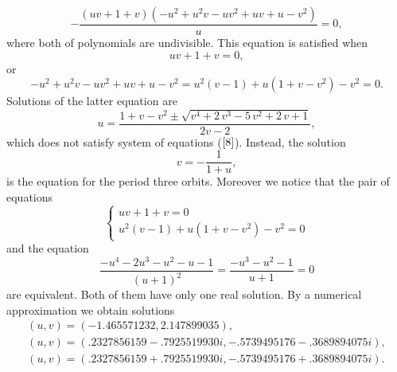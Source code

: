 \documentclass[12pt,a4paper]{amsart}
\numberwithin{equation}{section}
\numberwithin{lause}{section}
\begin{document}
 
\begin{displaymath}
-{\frac { \left( uv+1+v \right)  \left( -{u}^{2}+{u}^{2}v-u{v}^{2}+uv+
u-{v}^{2} \right) }{u}}=0,
\end{displaymath}
where both of polynomials are undivisible.
This equation is satisfied when
\begin{displaymath}
uv+1+v=0,
\end{displaymath}
or
\begin{displaymath}
 -{u}^{2}+{u}^{2}v-u{v}^{2}+uv+
u-{v}^{2} ={u}^{2}(v-1)+u(1+v-{v}^{2})-{v}^{2}
=0.
\end{displaymath}
Solutions of the latter equation are
\begin{displaymath}
u=\frac{1+v-{v}^{2} \pm \sqrt{{v}^{4}+2\,{v}^{3}-5\,{v}^{2}+2\,v+1}}{2v-2},
\end{displaymath}
which does not satisfy system of equations ($\ref{8}$). Instead, the solution
\begin{equation}
v=-\frac{1}{1+u}, \label{84}
\end{equation}
is the equation for the period three orbits. Moreover we notice that the pair of equations
\begin{displaymath}
\left\{\begin{array}{l}
   uv+1+v=0   \\
     {u}^{2}(v-1)+u(1+v-{v}^{2})-{v}^{2}=0
\end{array}\right.
\end{displaymath}
and the equation
\begin{displaymath}
\frac{-u^{4}-2u^{3}-u^{2}-u-1}{(u+1)^{2}}=\frac{-{u}^{3}-{u}^{2}-1}{u+1}=0
\end{displaymath}
are equivalent. Both of them have only one real solution. By a numerical approximation we obtain solutions
 \begin{displaymath}
\begin{array}{l}
 (u,v)=(-1.465571232, 2.147899035), \\ (u,v)=(.2327856159-.7925519930i, -.5739495176-.3689894075i),\\ (u,v)=(.2327856159+.7925519930i, -.5739495176+.3689894075i).
\end{array}
\end{displaymath}
\end{document}
